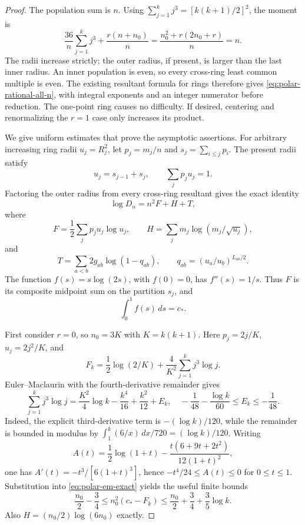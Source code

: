 \documentclass[11pt]{article}
\theoremstyle{remark}
\numberwithin{equation}{section}
\begin{document}
\begin{proof}
The population sum is $n$.  Using
$\sum_{j=1}^k j^3=[k(k+1)/2]^2$, the moment is
\[
 \frac{36}{n}\sum_{j=1}^k j^3+
 \frac{r(n+n_0)}n
 =\frac{n_0^2+r(2n_0+r)}n=n.
\]
The radii increase strictly; the outer radius, if present, is
larger than the last inner radius.  An inner population is even,
so every cross-ring least common multiple is even.  The existing
resultant formula for rings therefore gives
\eqref{eq:polar-rational-all-n}, with integral exponents and an
integer numerator before reduction.  The one-point ring causes
no difficulty.  If desired, centering and renormalizing the
$r=1$ case only increases its product.

We give uniform estimates that prove the asymptotic assertions.
For arbitrary increasing ring radii $u_j=R_j^2$, let
$p_j=m_j/n$ and $s_j=\sum_{i\le j}p_i$.
The present radii satisfy
\[
 u_j=s_{j-1}+s_j,\qquad \sum_jp_ju_j=1.
\]
Factoring the outer radius from every cross-ring resultant gives
the exact identity
\begin{equation}\label{eq:polar-energy-decomposition}
 \log D_n=n^2F+H+T,
\end{equation}
where
\[
 F=\frac12\sum_jp_ju_j\log u_j,
 \qquad H=\sum_jm_j\log(m_j/\sqrt{u_j}),
\]
and
\[
 T=\sum_{a<b}2g_{ab}\log(1-q_{ab}),\qquad
 q_{ab}=(u_a/u_b)^{L_{ab}/2}.
\]
The function $f(s)=s\log(2s)$, with $f(0)=0$, has
$f''(s)=1/s$.  Thus $F$ is its composite midpoint sum on
the partition $s_j$, and
\[
 \int_0^1f(s)\,ds=c_*.
\]

First consider $r=0$, so $n_0=3K$ with $K=k(k+1)$.
Here $p_j=2j/K$, $u_j=2j^2/K$, and
\[
 F_k=\frac12\log(2/K)+\frac4{K^2}\sum_{j=1}^k j^3\log j.
\]
Euler--Maclaurin with the fourth-derivative remainder gives
\begin{equation}\label{eq:polar-em-exact}
 \sum_{j=1}^k j^3\log j
 =\frac{K^2}{4}\log k-\frac{k^4}{16}
  +\frac{k^2}{12}+E_k,
 \quad
 -\frac1{48}-\frac{\log k}{60}
 \le E_k\le-\frac1{48}.
\end{equation}
Indeed, the explicit third-derivative term is
$-(\log k)/120$, while the remainder is bounded in modulus by
$\int_1^k(6/x)\,dx/720=(\log k)/120$.
Writing
\[
 A(t)=\frac12\log(1+t)
 -\frac{t(6+9t+2t^2)}{12(1+t)^2},
\]
one has $A'(t)=-t^3/[6(1+t)^3]$, hence
$-t^4/24\le A(t)\le0$ for $0\le t\le1$.
Substitution into \eqref{eq:polar-em-exact} yields the useful
finite bounds
\begin{equation}\label{eq:polar-midpoint-cost}
 \frac{n_0}{2}-\frac34
 \le n_0^2(c_*-F_k)
 \le\frac{n_0}{2}+\frac34+\frac35\log k.
\end{equation}
Also $H=(n_0/2)\log(6n_0)$ exactly.


\end{proof}
\end{document}
